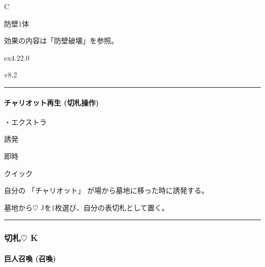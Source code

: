 \documentclass[letterpaper,10pt,dvipdfmx]{sphinxmanual}
\begin{document}
\sphinxAtStartPar
{} C

\sphinxAtStartPar
{}

\sphinxAtStartPar
防壁1体

\sphinxAtStartPar
{}

\sphinxAtStartPar
効果の内容は「防壁破壊」を参照。

\sphinxAtStartPar
{}  ex4.22.0

\sphinxAtStartPar
{}  v8.2


\bigskip\hrule\bigskip



\paragraph{チャリオット再生 (切札操作)}
\label{\detokenize{auto/frameActionlist:act-chariotrevive}}\label{\detokenize{auto/frameActionlist:id48}}
\sphinxAtStartPar
{}

\sphinxAtStartPar
・エクストラ

\sphinxAtStartPar
{} 誘発

\sphinxAtStartPar
{} 即時

\sphinxAtStartPar
{} クイック

\sphinxAtStartPar
{}

\sphinxAtStartPar
自分の 「チャリオット」 が場から墓地に移った時に誘発する。

\sphinxAtStartPar
{}

\sphinxAtStartPar
墓地から{\normalsize $\heartsuit$} Jを1枚選び、自分の表切札として置く。


\bigskip\hrule\bigskip



\subsubsection{切札{\normalsize $\heartsuit$} K}
\label{\detokenize{auto/frameActionlist:id49}}

\paragraph{巨人召喚 (召喚)}
\label{\detokenize{auto/frameActionlist:act-summongiant}}\label{\detokenize{auto/frameActionlist:id50}}
\sphinxAtStartPar
{}
\end{document}
